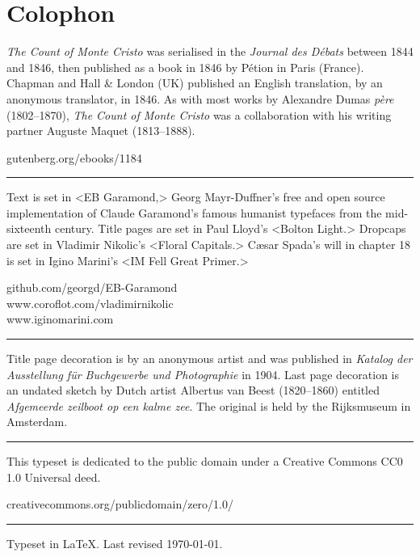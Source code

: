 \documentclass[
paper=5.5in:8.5in,
]{scrbook}
\begin{document}
\chapter*{Colophon}
\vfill
\centering
\begin{minipage}{\textwidth}
\textit{The Count of Monte Cristo} was serialised in the \textit{Journal des Débats} between 1844 and 1846, then published as a book in 1846 by Pétion in Paris (France). Chapman and Hall \& London (UK) published an English translation, by an anonymous translator, in 1846. As with most works by Alexandre Dumas \textit{père} (1802--1870), \textit{The Count of Monte Cristo} was a collaboration with his writing partner Auguste Maquet (1813--1888).
\end{minipage}
\vfill
gutenberg.org/ebooks/1184
\vfill
\rule{0.5\textwidth}{.4pt}
\vfill
\begin{minipage}{\textwidth}
Text is set in <EB Garamond,> Georg Mayr-Duffner's free and open source implementation of Claude Garamond’s famous humanist typefaces from the mid-sixteenth century. Title pages are set in Paul Lloyd's <Bolton Light.> Dropcaps are set in Vladimir Nikolic's <Floral Capitals.> Cæsar Spada's will in chapter 18 is set in Igino Marini's <IM Fell Great Primer.>
\end{minipage}
\vfill
github.com/georgd/EB-Garamond\\www.coroflot.com/vladimirnikolic\\www.iginomarini.com
\vfill
\rule{0.5\textwidth}{.4pt}
\vfill
\begin{minipage}{\textwidth}
Title page decoration is by an anonymous artist and was published in \textit{Katalog der Ausstellung für Buchgewerbe und Photographie} in 1904. Last page decoration is an undated sketch by Dutch artist Albertus van Beest (1820--1860) entitled \textit{Afgemeerde zeilboot op een kalme zee}. The original is held by the Rijksmuseum in Amsterdam.
\end{minipage}
\vfill
\rule{0.5\textwidth}{.4pt}
\vfill
\begin{minipage}{\textwidth}
This typeset is dedicated to the public domain under a Creative Commons CC0 1.0 Universal deed.
\end{minipage}
\vfill
creativecommons.org/publicdomain/zero/1.0/
\vfill
\rule{0.5\textwidth}{.4pt}
\vfill
Typeset in \LaTeX{}. Last revised \today.
\thispagestyle{empty}
\end{document}

